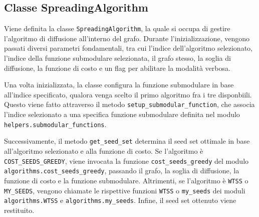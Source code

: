 \subsection{Classe SpreadingAlgorithm}

Viene definita la classe \texttt{SpreadingAlgorithm}, la quale si occupa di gestire l'algoritmo di diffusione all'interno del grafo. Durante l'inizializzazione, vengono passati diversi parametri fondamentali, tra cui l'indice dell'algoritmo selezionato, l'indice della funzione submodulare selezionata, il grafo stesso, la soglia di diffusione, la funzione di costo e un flag per abilitare la modalità verbosa.

Una volta inizializzata, la classe configura la funzione submodulare in base all'indice specificato, qualora venga scelto il primo algoritmo fra i tre disponbiili. Questo viene fatto attraverso il metodo \texttt{setup_submodular_function}, che associa l'indice selezionato a una specifica funzione submodulare definita nel modulo \texttt{helpers.submodular_functions}.

Successivamente, il metodo \texttt{get_seed_set} determina il seed set ottimale in base all'algoritmo selezionato e alla funzione di costo. Se l'algoritmo è \texttt{COST_SEEDS_GREEDY}, viene invocata la funzione \texttt{cost_seeds_greedy} del modulo \texttt{algorithms.cost_seeds_greedy}, passando il grafo, la soglia di diffusione, la funzione di costo e la funzione submodulare. Altrimenti, se l'algoritmo è \texttt{WTSS} o \texttt{MY_SEEDS}, vengono chiamate le rispettive funzioni \texttt{WTSS} o \texttt{my_seeds} dei moduli \texttt{algorithms.WTSS} e \texttt{algorithms.my_seeds}. Infine, il seed set ottenuto viene restituito.

